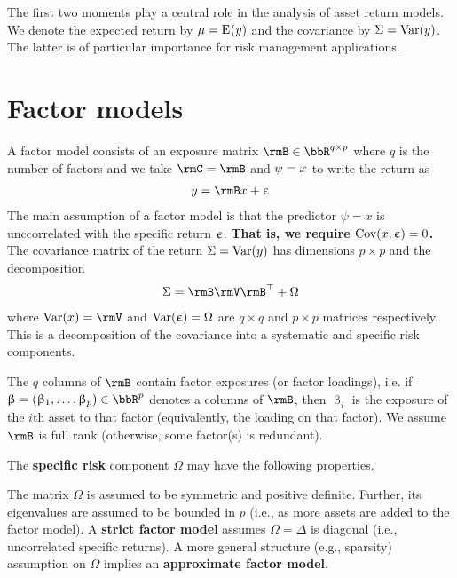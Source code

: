 \documentclass[leqno,12pt]{article}
\begin{document}
{The first two moments play a central role in the
analysis of asset return models. We denote the expected return
by $\mu = \textup{E}\hspace{.5pt} (y)$ and the covariance by
$\Sigma = \textup{Var}(y)$. The latter is of particular importance
for risk management applications.

\section{Factor models} \label{sec:fm}
A factor model consists of an exposure matrix 
$\rmB \in \bbR^{q \times p}$ where $q$ is the number of 
factors and we take $\rmC = \rmB$ and $\psi = x$ to write 
the return as
\begin{align}
y = \rmB x + \res
\end{align}
The main assumption of a factor model is that
the predictor $\psi = x$ is unccorrelated with the specific
return
$\upepsilon$.  {\bf That is, we require $\textup{Cov}(x, \upepsilon) = 0$.}
The covariance matrix of 
the return $\Sigma = \textup{Var}(y)$ has dimensions $p\times p$ and
 the decomposition
\begin{align} \label{covdec}
  \tcov = \rmB \rmV \rmB^\top + \Omega
\end{align}
where $\Var(x) = \rmV$ and $\textup{Var}(\upepsilon) = \Omega$ are
$q\times q$ and $p\times p$ matrices respectively. This
is a decomposition of the covariance into 
a systematic and specific risk components. 

\begin{mdframed}[style=clean]
  The $q$ columns of $\rmB$ contain factor exposures (or 
factor loadings), i.e. if $\upbeta 
= (\upbeta_1, \dots, \upbeta_p) \in \bbR^p$ denotes
a columns of $\rmB$, then $\upbeta_i$ is the exposure of the
$i$th asset to that factor (equivalently, the loading on that
factor). We assume $\rmB$ is full rank (otherwise, some
factor(s) is redundant).
\end{mdframed}

The {\bf specific risk} component 
$\Omega$ may have the following properties.

\begin{mdframed}[style=clean]
The matrix $\Omega$ is assumed to be symmetric and 
positive definite. Further, its eigenvalues are assumed to be 
bounded in $p$ (i.e., as more assets are added to the 
factor model).
A {\bf strict factor model} assumes 
$\Omega = \Delta$ is diagonal (i.e., uncorrelated
specific returns). A more general structure (e.g.,
sparsity) assumption on $\Omega$ 
implies an {\bf approximate
factor model}. 
\end{mdframed}

}
\end{document}
